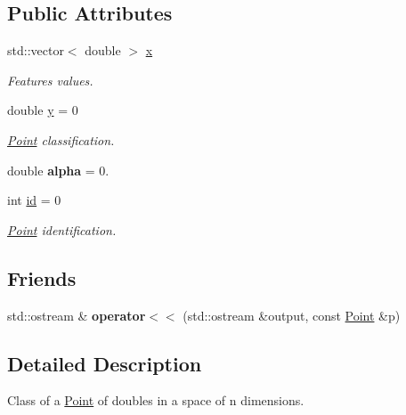 \subsection*{Public Attributes}
\begin{DoxyCompactItemize}
\item 
\mbox{\label{class_point_a1e22056737f10e31025b353c86e3b9e3}} 
std\+::vector$<$ double $>$ \hyperlink{class_point_a1e22056737f10e31025b353c86e3b9e3}{x}
\begin{DoxyCompactList}\small\item\em Features values. \end{DoxyCompactList}\item 
\mbox{\label{class_point_afa38be143ae800e6ad69ce8ed4df62d8}} 
double \hyperlink{class_point_afa38be143ae800e6ad69ce8ed4df62d8}{y} = 0
\begin{DoxyCompactList}\small\item\em \hyperlink{class_point}{Point} classification. \end{DoxyCompactList}\item 
\mbox{\label{class_point_a8595ba929b962c97293ab35a0c60b434}} 
double {\bfseries alpha} = 0.
\item 
\mbox{\label{class_point_a3ccd2080027d6845744bd044280da9e7}} 
int \hyperlink{class_point_a3ccd2080027d6845744bd044280da9e7}{id} = 0
\begin{DoxyCompactList}\small\item\em \hyperlink{class_point}{Point} identification. \end{DoxyCompactList}\end{DoxyCompactItemize}
\subsection*{Friends}
\begin{DoxyCompactItemize}
\item 
\mbox{\label{class_point_a18e1e2eb3b3b27719f367688e8611b45}} 
std\+::ostream \& {\bfseries operator$<$$<$} (std\+::ostream \&output, const \hyperlink{class_point}{Point} \&p)
\end{DoxyCompactItemize}


\subsection{Detailed Description}
Class of a \hyperlink{class_point}{Point} of doubles in a space of n dimensions. 

